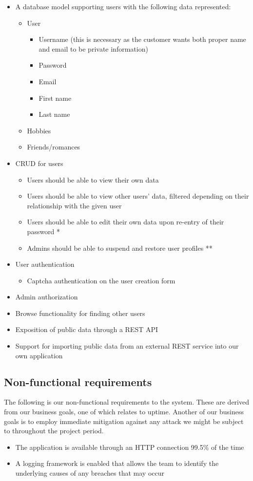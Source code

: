 \documentclass[a4paper]{article}
\begin{document}
\begin{itemize}
\item A database model supporting users with the following data represented:
  \begin{itemize}
  \item User
      \begin{itemize}
      \item Username (this is necessary as the customer wants both proper name and email to be private information)
      \item Password
      \item Email
      \item First name
      \item Last name
      \end{itemize}
  \item Hobbies
  \item Friends/romances
  \end{itemize}
\item CRUD for users
	\begin{itemize}
    \item Users should be able to view their own data
    \item Users should be able to view other users' data, filtered depending on their relationship with the given user
    \item Users should be able to edit their own data upon re-entry of their password *
    \item Admins should be able to suspend and restore user profiles **
    \end{itemize}
\item User authentication
	\begin{itemize}
	\item Captcha authentication on the user creation form
	\end{itemize}
\item Admin authorization
\item Browse functionality for finding other users
\item Exposition of public data through a REST API
\item Support for importing public data from an external REST service into our own application
\end{itemize}

\subsection{Non-functional requirements}
The following is our non-functional requirements to the system. These are derived from our business goals, one of which relates to uptime. Another of our business goals is to employ immediate mitigation against any attack we might be subject to throughout the project period.
\begin{itemize}
\item The application is available through an HTTP connection 99.5\% of the time
\item A logging framework is enabled that allows the team to identify the underlying causes of any breaches that may occur
\end{itemize}
\end{document}
